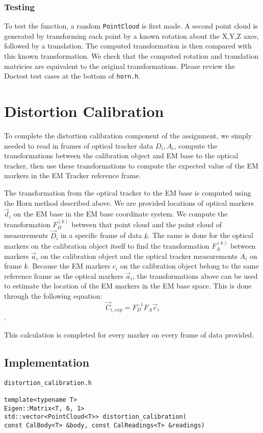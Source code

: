 \documentclass[letterpaper, 11pt]{report}
\begin{document}
\subsubsection{Testing}
To test the function, a random \texttt{PointCloud} is first made. A second point cloud is generated by transforming each point by a known rotation about the X,Y,Z axes, followed by a translation. The computed transformation is then compared with this known transformation. We check that the computed rotation and translation matricies are equivalent to the original transformations. Please review the Doctest test cases at the bottom of \texttt{horn.h}.

\section{Distortion Calibration}

To complete the distortion calibration component of the assignment, we simply needed to read in frames of optical tracker data $D_i, A_i$, compute the transformations between the calibration object and EM base to the optical tracker, then use these transformations to compute the expected value of the EM markers in the EM Tracker reference frame.

The transformation from the optical tracker to the EM base is computed using the Horn method described above. We are provided locations of optical markers $\vec d_i$ on the EM base in the EM base coordinate system. We compute the transformation $F_{D}^{(k)}$ between that point cloud and the point cloud of measurements $\vec D_i$ in a specific frame of data $k$. The same is done for the optical markers on the calibration object itself to find the transformation $F_{A}^{(k)}$ between markers $\vec a_i$ on the calibration object and the optical tracker measurements $A_i$ on frame $k$. Because the EM markers $c_i$ on the calibration object belong to the same reference frame as the optical markers $\vec a_i$, the transformations above can be used to estimate the location of the EM markers in the EM base space. This is done through the following equation:
$$\vec C_{i,exp} = F_{D}^{-1}F_A \vec  c_i$$.

This calculation is completed for every marker on every frame of data provided.
\\
\subsection{Implementation}
 \begin{verbatim}
distortion_calibration.h

template<typename T>
Eigen::Matrix<T, 6, 1>
std::vector<PointCloud<T>> distortion_calibration(
const CalBody<T> &body, const CalReadings<T> &readings)
 \end{verbatim}
\end{document}
